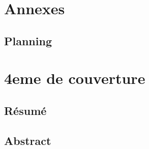 \documentclass[a4paper, 11pt]{report}
\begin{document}
\part{Annexes}
\begin{appendix}
	\chapter{Planning}
\end{appendix}

\part{4eme de couverture}
\chapter{Résumé}
\chapter{Abstract}
\end{document}
